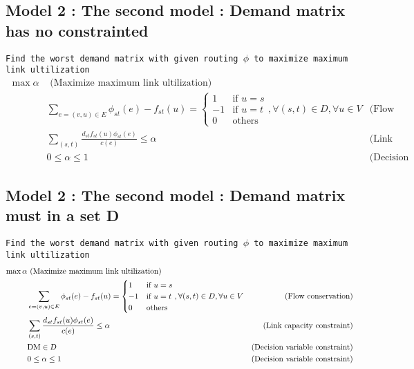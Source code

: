 \documentclass{ctexart}
\begin{document}
\subsection{Model 2 : The second model : Demand matrix has no constrainted}
\texttt{Find the worst demand matrix with given routing $\phi$  to maximize maximum link ultilization} 
\begin{equation}
	\begin{aligned}
		\max \alpha & \text{  (Maximize maximum link ultilization)}\\
		& \sum_{e=(v,u)\in E}\phi_{st}(e)-f_{st}(u)=\begin{cases}
			1 &\text{if } u=s \\
			-1 &\text{if } u=t \\
			0 &\text{others} 
		 \end{cases},\forall (s,t)\in D, \forall u\in V & \text{(Flow conservation)}\\
		& \sum_{(s,t)}\frac{
			d_{st}f_{st}(u)\phi_{st}(e)}{c(e)} \leq \alpha\ &  \text{(Link capacity constraint)} \\
		& 0\leq\alpha\leq1\ & \text{(Decision variable constraint)}
	\end{aligned}
\end{equation}

\subsection{Model 2 : The second model : Demand matrix must in a set D}
\texttt{Find the worst demand matrix with given routing $\phi$  to maximize maximum link ultilization} 
\begin{equation}
	\begin{aligned}
		\max \alpha & \text{  (Maximize maximum link ultilization)}\\
		& \sum_{e=(v,u)\in E}\phi_{st}(e)-f_{st}(u)=\begin{cases}
			1 &\text{if } u=s \\
			-1 &\text{if } u=t \\
			0 &\text{others} 
		 \end{cases},\forall (s,t)\in D, \forall u\in V & \text{(Flow conservation)}\\
		& \sum_{(s,t)}\frac{
			d_{st}f_{st}(u)\phi_{st}(e)}{c(e)} \leq \alpha\ &  \text{(Link capacity constraint)} \\
		& \text{DM}\in   \text{\sl D} & \text{(Decision variable constraint)}\\
		& 0\leq\alpha\leq1\ & \text{(Decision variable constraint)}
	\end{aligned}
\end{equation}
\end{document}
